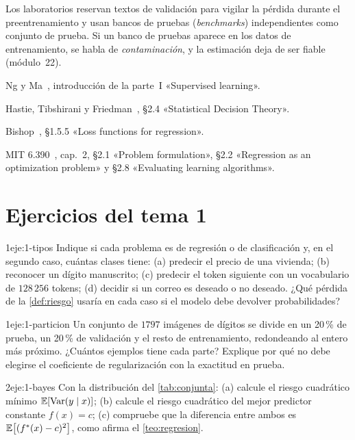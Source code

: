 \begin{observacion}
Los laboratorios reservan textos de validación para vigilar la pérdida durante el preentrenamiento y usan bancos de pruebas (\emph{benchmarks}) independientes como conjunto de prueba. Si un banco de pruebas aparece en los datos de entrenamiento, se habla de \emph{contaminación}, y la estimación deja de ser fiable (módulo~22).
\end{observacion}

\begin{lecturas}
\item Ng y Ma~\cite{cs229}, introducción de la parte~I «Supervised learning».
\item Hastie, Tibshirani y Friedman~\cite{esl}, §2.4 «Statistical Decision Theory».
\item Bishop~\cite{bishop}, §1.5.5 «Loss functions for regression».
\item MIT 6.390~\cite{mit6390}, cap.~2, §2.1 «Problem formulation», §2.2 «Regression as an optimization problem» y §2.8 «Evaluating learning algorithms».
\end{lecturas}

\section*{Ejercicios del tema 1}

\begin{ejercicio}{1}{eje:1-tipos}
Indique si cada problema es de regresión o de clasificación y, en el segundo caso, cuántas clases tiene: (a) predecir el precio de una vivienda; (b) reconocer un dígito manuscrito; (c) predecir el token siguiente con un vocabulario de $128\,256$ tokens; (d) decidir si un correo es deseado o no deseado. ¿Qué pérdida de la \cref{def:riesgo} usaría en cada caso si el modelo debe devolver probabilidades?
\end{ejercicio}

\begin{ejercicio}{1}{eje:1-particion}
Un conjunto de $1797$ imágenes de dígitos se divide en un 20\,\% de prueba, un 20\,\% de validación y el resto de entrenamiento, redondeando al entero más próximo. ¿Cuántos ejemplos tiene cada parte? Explique por qué no debe elegirse el coeficiente de regularización con la exactitud en prueba.
\end{ejercicio}

\begin{ejercicio}{2}{eje:1-bayes}
Con la distribución del \cref{tab:conjunta}: (a) calcule el riesgo cuadrático mínimo $\mathbb{E}[\operatorname{Var}(y\mid x)]$; (b) calcule el riesgo cuadrático del mejor predictor constante $f(x)=c$; (c) compruebe que la diferencia entre ambos es $\mathbb{E}\bigl[(f^{*}(x)-c)^{2}\bigr]$, como afirma el \cref{teo:regresion}.
\end{ejercicio}

